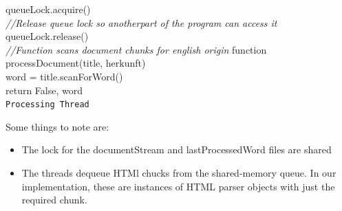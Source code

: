 \documentclass{article}
\begin{document}
\begin{center}
\begin{minipage}{0.8\linewidth}
\begin{algorithm}[H]
{					queueLock.acquire()\\
					\textit{//Release queue lock so anotherpart of the program can access it}
					queueLock.release()\\
					\medskip
				}
				\medskip
				\textit{//Function scans document chunks for english origin}
				function processDocument(title, herkunft)\\
						word = title.scanForWord()\\
						return False, word\\
			\caption{\texttt{Processing Thread}} %
		\end{algorithm}
	\end{minipage}
\end{center}

Some things to note are:
\begin{itemize}
	\item The lock for the documentStream and lastProcessedWord files are shared
	\item The threads dequeue HTMl chucks from the shared-memory queue. In our implementation, these are instances of HTML parser objects with just the required chunk.
\end{itemize}
\end{document}
